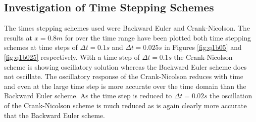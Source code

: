\documentclass[11pt]{article}
\begin{document}
\subsection{Investigation of Time Stepping Schemes}

The times stepping schemes used were Backward Euler and Crank-Nicolson. The results at $x = 0.8m$ for over the time range have been plotted both time stepping schemes at time steps of $\Delta t = 0.1s$ and $\Delta t = 0.025s$ in Figures \ref{fig:q1b05} and \ref{fig:q1b025} respectively. With a time step of $\Delta t = 0.1s$  the Crank-Nicolson scheme is showing oscillatory solution whereas the Backward Euler scheme does not oscillate. The oscillatory response of the Crank-Nicolson reduces with time and even at the large time step is more accurate over the time domain than the Backward Euler scheme. As the time step is reduced to $\Delta t = 0.02s$ the oscillation of the Crank-Nicolson scheme is much reduced as is again clearly more accurate that the Backward Euler scheme.
\end{document}
